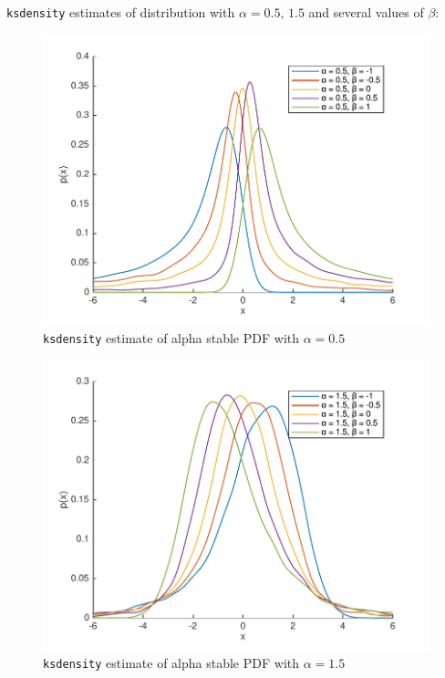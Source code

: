 \documentclass[12pt]{article}
\newcommand{\code}[1]{\texttt{#1}}
\begin{document}
\begin{enumerate}
\code{ksdensity} estimates of distribution with $\alpha=0.5,\,1.5$ and several values of $\beta$:

\begin{figure}[H]
\includegraphics[width=\textwidth]{figures/alpha-0_5-with-several-beta.pdf}
  \caption{\code{ksdensity} estimate of alpha stable PDF with $\alpha = 0.5$ }
\end{figure}

\begin{figure}[H]
\includegraphics[width=\textwidth]{figures/alpha-1_5-with-several-beta.pdf}
  \caption{\code{ksdensity} estimate of alpha stable PDF with $\alpha = 1.5$ }
\end{figure}


\end{enumerate}
\end{document}
